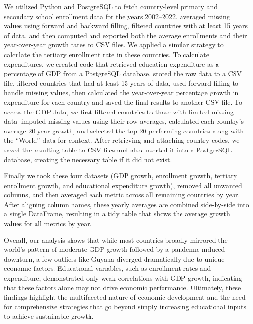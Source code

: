 \documentclass[
  letterpaper,
  DIV=11,
  numbers=noendperiod]{scrartcl}
\begin{document}
We utilized Python and PostgreSQL to fetch country-level primary and
secondary school enrollment data for the years 2002--2022, averaged
missing values using forward and backward filling, filtered countries
with at least 15 years of data, and then computed and exported both the
average enrollments and their year-over-year growth rates to CSV files.
We applied a similar strategy to calculate the tertiary enrollment rate
in these countries. To calculate expenditures, we created code that
retrieved education expenditure as a percentage of GDP from a PostgreSQL
database, stored the raw data to a CSV file, filtered countries that had
at least 15 years of data, used forward filling to handle missing
values, then calculated the year-over-year percentage growth in
expenditure for each country and saved the final results to another CSV
file. To access the GDP data, we first filtered countries to those with
limited missing data, imputed missing values using their row-averages,
calculated each country's average 20-year growth, and selected the top
20 performing countries along with the ``World'' data for context. After
retrieving and attaching country codes, we saved the resulting table to
CSV files and also inserted it into a PostgreSQL database, creating the
necessary table if it did not exist.

Finally we took these four datasets (GDP growth, enrollment growth,
tertiary enrollment growth, and educational expenditure growth), removed
all unwanted columns, and then averaged each metric across all remaining
countries by year. After aligning column names, these yearly averages
are combined side-by-side into a single DataFrame, resulting in a tidy
table that shows the average growth values for all metrics by year.

Overall, our analysis shows that while most countries broadly mirrored
the world's pattern of moderate GDP growth followed by a
pandemic-induced downturn, a few outliers like Guyana diverged
dramatically due to unique economic factors. Educational variables, such
as enrollment rates and expenditure, demonstrated only weak correlations
with GDP growth, indicating that these factors alone may not drive
economic performance. Ultimately, these findings highlight the
multifaceted nature of economic development and the need for
comprehensive strategies that go beyond simply increasing educational
inputs to achieve sustainable growth.
\end{document}
